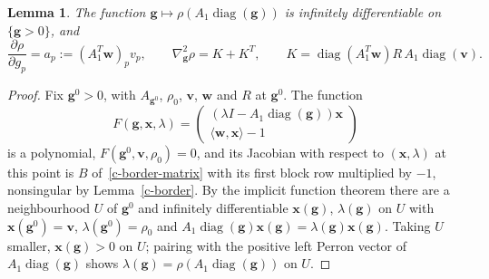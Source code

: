 \documentclass[11pt]{article}
\theoremstyle{plain}
\newtheorem{lemma}[theorem]{Lemma}
\theoremstyle{remark}
\numberwithin{equation}{section}
\begin{document}
\begin{lemma}\label{c-rho-g}
The function $\bm g\mapsto\rho\left(A_1\operatorname{diag}(\bm g)\right)$ is
infinitely differentiable on $\{\bm g>0\}$, and
\begin{equation}\label{c-rho-g-derivs}
\frac{\partial\rho}{\partial g_p}=a_p:=\left(A_1^T\bm w\right)_pv_p,\qquad
\nabla^2_{\bm g}\rho=K+K^T,\qquad
K=\operatorname{diag}\left(A_1^T\bm w\right)R\,A_1\operatorname{diag}(\bm v).
\end{equation}
\end{lemma}
\begin{proof}
Fix $\bm g^0>0$, with $A_{\bm g^0}$, $\rho_0$, $\bm v$, $\bm w$ and $R$ at $\bm g^0$.
The function
\begin{equation*}
F(\bm g,\bm x,\lambda)=\begin{pmatrix}\left(\lambda I-A_1\operatorname{diag}(\bm g)\right)\bm x\\
\langle\bm w,\bm x\rangle-1\end{pmatrix}
\end{equation*}
is a polynomial, $F(\bm g^0,\bm v,\rho_0)=0$, and its Jacobian with respect
to $(\bm x,\lambda)$ at this point is $B$ of~\eqref{c-border-matrix} with
its first block row multiplied by $-1$, nonsingular by Lemma~\ref{c-border}.
By the implicit function theorem there are a neighbourhood $U$ of $\bm g^0$
and infinitely differentiable $\bm x(\bm g)$, $\lambda(\bm g)$ on $U$ with
$\bm x(\bm g^0)=\bm v$, $\lambda(\bm g^0)=\rho_0$ and
$A_1\operatorname{diag}(\bm g)\bm x(\bm g)=\lambda(\bm g)\bm x(\bm g)$. Taking
$U$ smaller, $\bm x(\bm g)>0$ on $U$; pairing with the positive left Perron
vector of $A_1\operatorname{diag}(\bm g)$ shows
$\lambda(\bm g)=\rho\left(A_1\operatorname{diag}(\bm g)\right)$ on $U$.


\end{proof}
\end{document}
